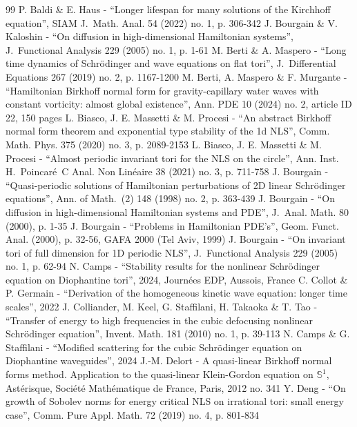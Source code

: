 \documentclass[10pt,a4paper]{amsart}
\theoremstyle{plain}
\theoremstyle{definition}
\newcommand{\1}{\mathbf{1}}
\begin{document}
\begin{thebibliography}{99}
 P. Baldi \& E. Haus - “Longer lifespan for many solutions of the Kirchhoff equation”, SIAM J. Math. Anal. 54 (2022) no. 1, p. 306-342
 J. Bourgain \& V. Kaloshin - “On diffusion in high-dimensional Hamiltonian systems”, J. Functional Analysis 229 (2005) no. 1, p. 1-61
 M. Berti \& A. Maspero - “Long time dynamics of Schrödinger and wave equations on flat tori”, J. Differential Equations 267 (2019) no. 2, p. 1167-1200
 M. Berti, A. Maspero \& F. Murgante - “Hamiltonian Birkhoff normal form for gravity-capillary water waves with constant vorticity: almost global existence”, Ann. PDE 10 (2024) no. 2, article ID 22, 150 pages
 L. Biasco, J. E. Massetti \& M. Procesi - “An abstract Birkhoff normal form theorem and exponential type stability of the 1d NLS”, Comm. Math. Phys. 375 (2020) no. 3, p. 2089-2153
 L. Biasco, J. E. Massetti \& M. Procesi - “Almost periodic invariant tori for the NLS on the circle”, Ann. Inst. H. Poincaré C Anal. Non Linéaire 38 (2021) no. 3, p. 711-758
 J. Bourgain - “Quasi-periodic solutions of Hamiltonian perturbations of 2D linear Schrödinger equations”, Ann. of Math. (2) 148 (1998) no. 2, p. 363-439
 J. Bourgain - “On diffusion in high-dimensional Hamiltonian systems and PDE”, J. Anal. Math. 80 (2000), p. 1-35
 J. Bourgain - “Problems in Hamiltonian PDE’s”, Geom. Funct. Anal. (2000), p. 32-56, GAFA 2000 (Tel Aviv, 1999)
 J. Bourgain - “On invariant tori of full dimension for 1D periodic NLS”, J. Functional Analysis 229 (2005) no. 1, p. 62-94
 N. Camps - “Stability results for the nonlinear Schrödinger equation on Diophantine tori”, 2024, Journées EDP, Aussois, France
 C. Collot \& P. Germain - “Derivation of the homogeneous kinetic wave equation: longer time scales”, 2022
 J. Colliander, M. Keel, G. Staffilani, H. Takaoka \& T. Tao - “Transfer of energy to high frequencies in the cubic defocusing nonlinear Schrödinger equation”, Invent. Math. 181 (2010) no. 1, p. 39-113
 N. Camps \& G. Staffilani - “Modified scattering for the cubic Schrödinger equation on Diophantine waveguides”, 2024
 J.-M. Delort - A quasi-linear Birkhoff normal forms method. Application to the quasi-linear Klein-Gordon equation on $\mathbb{S}^1$, Astérisque, Société Mathématique de France, Paris, 2012 no. 341
 Y. Deng - “On growth of Sobolev norms for energy critical NLS on irrational tori: small energy case”, Comm. Pure Appl. Math. 72 (2019) no. 4, p. 801-834

\end{thebibliography}
\end{document}
